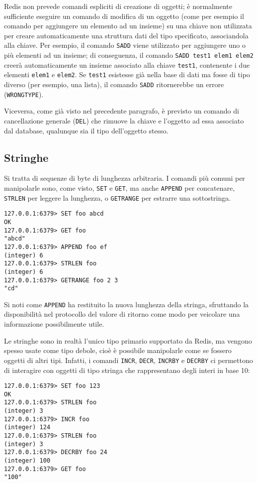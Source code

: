 Redis non prevede comandi espliciti di creazione di oggetti; è normalmente sufficiente
eseguire un comando di modifica di un oggetto (come per esempio il comando per aggiungere
un elemento ad un insieme) su una chiave non utilizzata per creare automaticamente una
struttura dati del tipo specificato, associandola alla chiave. Per esempio, il comando
\verb|SADD| viene utilizzato per aggiungere uno o più elementi ad un insieme; di
conseguenza, il comando \verb|SADD test1 elem1 elem2| creerà automaticamente un insieme 
associato alla chiave \verb|test1|, contenente i due elementi \verb|elem1| e \verb|elem2|.
Se \verb|test1| esistesse già nella base di dati ma fosse di tipo diverso (per esempio,
una lista), il comando \verb|SADD| ritornerebbe un errore (\verb|WRONGTYPE|).

Viceversa, come già visto nel precedente paragrafo, è previsto un comando di cancellazione
generale (\verb|DEL|) che rimuove la chiave e l'oggetto ad essa associato dal database,
qualunque sia il tipo dell'oggetto stesso.


\subsection{Stringhe}

Si tratta di sequenze di byte di lunghezza arbitraria. I comandi
più comuni per manipolarle sono, come visto, \verb|SET| e \verb|GET|, ma anche \verb|APPEND|
per concatenare, \verb|STRLEN| per leggere la lunghezza, o \verb|GETRANGE| per estrarre una
sottostringa.

\medskip
\begin{lstlisting}
127.0.0.1:6379> SET foo abcd
OK
127.0.0.1:6379> GET foo
"abcd"
127.0.0.1:6379> APPEND foo ef
(integer) 6
127.0.0.1:6379> STRLEN foo
(integer) 6
127.0.0.1:6379> GETRANGE foo 2 3
"cd"
\end{lstlisting}

Si noti come \verb|APPEND| ha restituito la nuova lunghezza della stringa, sfruttando
la disponibilità nel protocollo del valore di ritorno come modo per veicolare una
informazione possibilmente utile.

Le stringhe sono in realtà l'unico tipo primario supportato da Redis, ma vengono spesso usate come
tipo debole, cioè è possibile manipolarle come se fossero oggetti di altri tipi. Infatti, i comandi
\verb|INCR|, \verb|DECR|,  \verb|INCRBY| e \verb|DECRBY| ci permettono di interagire con oggetti di
tipo stringa che rappresentano degli interi in base 10:

\medskip
\begin{lstlisting}
127.0.0.1:6379> SET foo 123
OK
127.0.0.1:6379> STRLEN foo
(integer) 3
127.0.0.1:6379> INCR foo
(integer) 124
127.0.0.1:6379> STRLEN foo
(integer) 3
127.0.0.1:6379> DECRBY foo 24
(integer) 100
127.0.0.1:6379> GET foo
"100"
\end{lstlisting}

